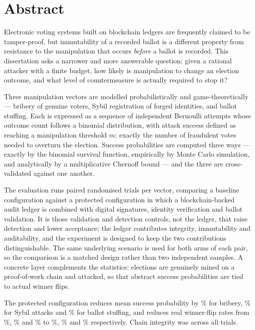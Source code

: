 \documentclass[11pt,a4paper]{article}
\begin{document}
\section*{Abstract}

Electronic voting systems built on blockchain ledgers are frequently claimed to be
tamper-proof, but immutability of a recorded ballot is a different property from
resistance to the manipulation that occurs \emph{before} a ballot is recorded. This
dissertation asks a narrower and more answerable question: given a rational attacker
with a finite budget, how likely is manipulation to change an election outcome, and
what level of countermeasure is actually required to stop it?

Three manipulation vectors are modelled probabilistically and game-theoretically ---
bribery of genuine voters, Sybil registration of forged identities, and ballot
stuffing. Each is expressed as a sequence of independent Bernoulli attempts whose
outcome count follows a binomial distribution, with attack success defined as reaching
a manipulation threshold $m$: exactly the number of fraudulent votes needed to overturn
the election. Success probabilities are computed three ways --- exactly by the binomial
survival function, empirically by Monte Carlo simulation, and analytically by a
multiplicative Chernoff bound --- and the three are cross-validated against one another.

The evaluation runs \TotalTrials{} paired randomised trials per vector, comparing a
baseline configuration against a protected configuration in which a blockchain-backed
audit ledger is combined with digital signatures, identity verification and ballot
validation. It is those validation and detection controls, not the ledger, that raise
detection and lower acceptance; the ledger contributes integrity, immutability and
auditability, and the experiment is designed to keep the two contributions
distinguishable. The same underlying scenario is used for both arms of each pair,
so the comparison is a matched design rather than two independent samples. A concrete
layer complements the statistics: \ElectionTrials{} elections are genuinely mined on a
proof-of-work chain and attacked, so that abstract success probabilities are tied to
actual winner flips.

The protected configuration reduces mean success probability by \BriberyRelReduction\%
for bribery, \SybilRelReduction\% for Sybil attacks and \BallotStuffingRelReduction\%
for ballot stuffing, and reduces real winner-flip rates from \FlipBriberyBaseline\%,
\FlipSybilBaseline\% and \FlipBallotStuffingBaseline\% to \FlipBriberyProtected\%,
\FlipSybilProtected\% and \FlipBallotStuffingProtected\% respectively. Chain integrity
was \ChainIntegrityHeld{} across all trials.
\end{document}
